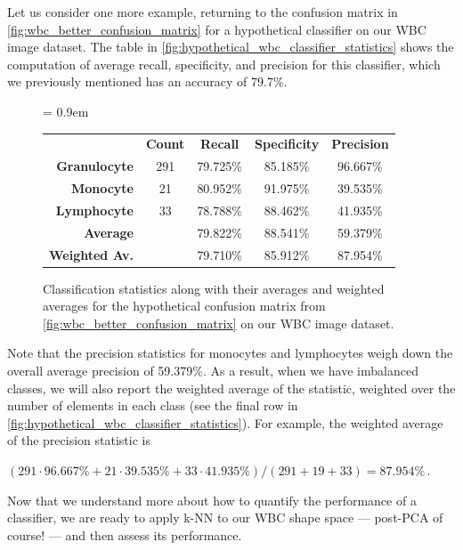 Let us consider one more example, returning to the confusion matrix in \autoref{fig:wbc_better_confusion_matrix} for a hypothetical classifier on our WBC image dataset. The table in \autoref{fig:hypothetical_wbc_classifier_statistics} shows the computation of average recall, specificity, and precision for this classifier, which we previously mentioned has an accuracy of 79.7\%.\\

\begin{figure}[h]
\centering
\tabcolsep = 0.9em
\mySfFamily
{}
\begin{tabular}{r c c c c}
\rowcolor{gray!50}
& \textbf{Count} & \textbf{Recall} & \textbf{Specificity} & \textbf{Precision} \\
\textbf{Granulocyte} & 291 & 79.725\% & 85.185\% & 96.667\%\\
\textbf{Monocyte} & \phantom{2}21 & 80.952\% & 91.975\% & 39.535\% \\
\textbf{Lymphocyte} & \phantom{2}33 & 78.788\% & 88.462\% & 41.935\%\\
\textbf{Average} & & 79.822\% & 88.541\% & 59.379\%\\
\textbf{Weighted Av.} & & 79.710\% & 85.912\% & 87.954\%\\
\end{tabular}
\caption{Classification statistics along with their averages and weighted averages for the hypothetical confusion matrix from \autoref{fig:wbc_better_confusion_matrix} on our WBC image dataset.}
\label{fig:hypothetical_wbc_classifier_statistics}
\end{figure}

Note that the precision statistics for monocytes and lymphocytes weigh down the overall average precision of 59.379\%. As a result, when we have imbalanced classes, we will also report the weighted average of the statistic, weighted over the number of elements in each class (see the final row in \autoref{fig:hypothetical_wbc_classifier_statistics}). For example, the weighted average of the precision statistic is

\begin{center}
$(291 \cdot 96.667\% + 21 \cdot 39.535\% + 33 \cdot 41.935\%)/(291+19+33) = 87.954\%$\,.
\end{center}

Now that we understand more about how to quantify the performance of a classifier, we are ready to apply k-NN to our WBC shape space --- post-PCA of course! --- and then assess its performance.

